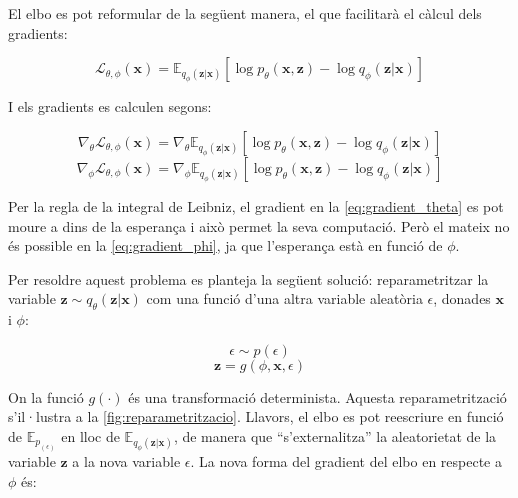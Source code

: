 \documentclass[CAT,BIB]{TFUOC}%
\begin{document}
        El \gls{elbo} es pot reformular de la següent manera,
        el que facilitarà el càlcul dels gradients:

        \begin{equation}
        \label{eq:elbo_2}
            \mathcal{L}_{\theta,\phi}(\mathbf{x}) =
            \mathbb{E}_{q_\phi(\mathbf{z|x})} [
                \log p_\theta(\mathbf{x,z}) -
                \log q_\phi(\mathbf{z|x})
            ]
        \end{equation}

        I els gradients es calculen segons:

        \begin{equation}
        \label{eq:gradient_theta}
            \nabla_\theta \mathcal{L}_{\theta,\phi}(\mathbf{x}) =
            \nabla_\theta \mathbb{E}_{q_\phi(\mathbf{z|x})} [
            \log p_\theta(\mathbf{x,z}) -
            \log q_\phi(\mathbf{z|x})
            ]
        \end{equation}
        \begin{equation}
        \label{eq:gradient_phi}
            \nabla_\phi \mathcal{L}_{\theta,\phi}(\mathbf{x}) =
            \nabla_\phi \mathbb{E}_{q_\phi(\mathbf{z|x})} [
            \log p_\theta(\mathbf{x,z}) -
            \log q_\phi(\mathbf{z|x})
            ]
        \end{equation}

        Per la regla de la integral de Leibniz, el gradient en la \cref{eq:gradient_theta} es pot moure a dins de la esperança i això permet la seva computació. Però el mateix no és possible en la \cref{eq:gradient_phi}, ja que l'esperança està en funció de $\phi$.

        Per resoldre aquest problema es planteja la següent solució:
        reparametritzar la variable $\mathbf{z} \sim q_\theta(\mathbf{z|x})$
        com una funció d'una altra variable aleatòria $\epsilon$, donades $\mathbf{x}$ i $\phi$:

        \begin{equation}
        \label{eq:epsilon}
            \epsilon \sim p(\epsilon)
        \end{equation}
        \begin{equation}
        \label{eq:z_reparam}
            \mathbf{z} = g(\phi, \mathbf{x}, \epsilon)
        \end{equation}

        On la funció $g(\cdot)$ és una transformació determinista.
        Aquesta reparametrització s'il·lustra a la \cref{fig:reparametritzacio}.
        Llavors, el \gls{elbo} es pot reescriure
        en funció de $\mathbb{E}_{p_(\epsilon)}$
        en lloc de $\mathbb{E}_{q_\phi(\mathbf{z|x})}$,
        de manera que ``s'externalitza'' la aleatorietat de la variable $\mathbf{z}$
        a la nova variable $\epsilon$.
        La nova forma del gradient del \gls{elbo} en respecte a $\phi$ és:
\end{document}

